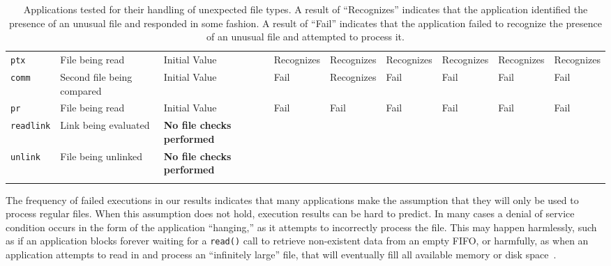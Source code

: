 \begin{table}[t]
\begin{tabular}{l  l  |  l  l  l  l  l  l  l}
        {\tt ptx}         & File being read            & Initial Value  & Recognizes     & Recognizes  & Recognizes & Recognizes  & Recognizes & Recognizes\\
        {\tt comm}        & Second file being compared & Initial Value  & Fail           & Recognizes  & Fail       & Fail        & Fail       & Fail\\
        {\tt pr}          & File being read            & Initial Value  & Fail           & Fail        & Fail       & Fail        & Fail       & Fail\\
\hline
        {\tt readlink}    & Link being evaluated       & \textbf{No file checks performed} & & & & & & \\
        {\tt unlink}      & File being unlinked        & \textbf{No file checks performed} & & & & & & \\
    \bottomrule{}
    \end{tabular}
    \caption{Applications tested for their handling of unexpected file types.  A
    result of ``Recognizes'' indicates that the application identified the
    presence of an unusual file and responded in some fashion.  A result of
    ``Fail'' indicates that the application failed to recognize the presence of
    an unusual file and attempted to process it.}
    \label{table:unexpectedtypes}
\end{table}

The frequency of failed executions in our results indicates that many
applications make the assumption that they will only be used to process
regular files.  When this assumption does not hold, execution results
can be hard to predict.  In many cases a denial of
service condition occurs in the form of the application ``hanging,'' as it
attempts to incorrectly process the file.  This may happen harmlessly, such
as if an application blocks forever waiting for a {\tt read()}
call to retrieve non-existent data from an empty FIFO, or harmfully, as
when an application attempts to read in and process an
``infinitely large'' file, that will eventually fill all
available memory or disk space~\cite{Cappos_CCS_08}.

